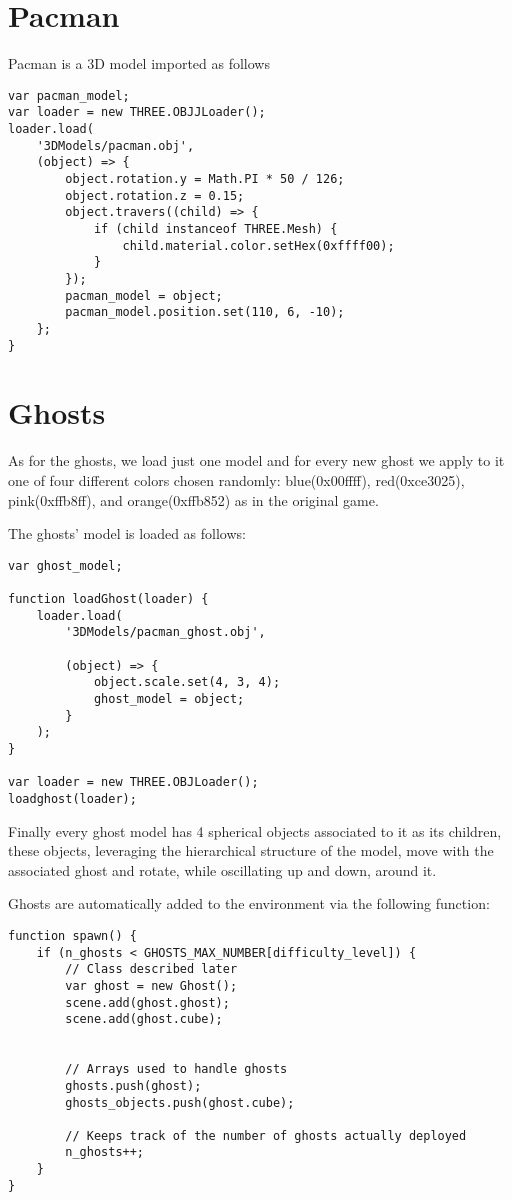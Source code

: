 \documentclass[a4paper,oneside]{report}
\begin{document}
\section{Pacman}
Pacman is a 3D model imported as follows
\begin{lstlisting}
var pacman_model;
var loader = new THREE.OBJJLoader();
loader.load(
	'3DModels/pacman.obj',
	(object) => {
		object.rotation.y = Math.PI * 50 / 126;
		object.rotation.z = 0.15;
		object.travers((child) => {
			if (child instanceof THREE.Mesh) {
				child.material.color.setHex(0xffff00);
			}
		});
		pacman_model = object;
		pacman_model.position.set(110, 6, -10);
	};
}
\end{lstlisting}

\section{Ghosts}
As for the ghosts, we load just one model and for every new ghost we apply to it one of four different colors chosen randomly: blue(0x00ffff), red(0xce3025), pink(0xffb8ff), and orange(0xffb852) as in the original game.

The ghosts' model is loaded as follows:
\begin{lstlisting}
var ghost_model;

function loadGhost(loader) {
    loader.load(
        '3DModels/pacman_ghost.obj', 

        (object) => {
            object.scale.set(4, 3, 4);
            ghost_model = object;
        }
    );
}

var loader = new THREE.OBJLoader();
loadghost(loader);
\end{lstlisting}

Finally every ghost model has 4 spherical objects associated to it as its children, these objects, leveraging the hierarchical structure of the model, move with the associated ghost and rotate, while oscillating up and down, around it.

Ghosts are automatically added to the environment via the following function: 
\begin{lstlisting}
function spawn() {
    if (n_ghosts < GHOSTS_MAX_NUMBER[difficulty_level]) {
        // Class described later
        var ghost = new Ghost();
        scene.add(ghost.ghost);
        scene.add(ghost.cube);


	    // Arrays used to handle ghosts
        ghosts.push(ghost);
        ghosts_objects.push(ghost.cube);
        
        // Keeps track of the number of ghosts actually deployed
        n_ghosts++;
    }
}
\end{lstlisting}
\end{document}
